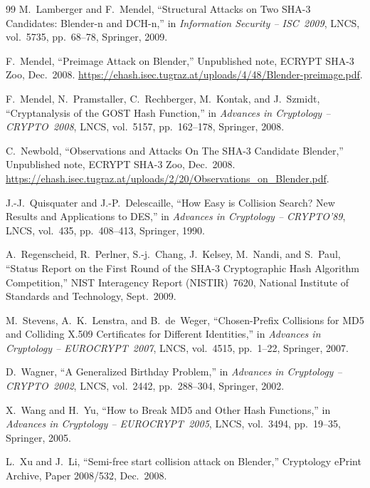 \documentclass[11pt,a4paper]{article}
\theoremstyle{definition}
\theoremstyle{remark}
\begin{document}
{\begin{thebibliography}{99}
M.~Lamberger and F.~Mendel,
``Structural Attacks on Two SHA-3 Candidates: Blender-n and DCH-n,'' in \emph{Information Security -- ISC~2009}, LNCS, vol.~5735, pp.~68--78, Springer, 2009.

F.~Mendel,
``Preimage Attack on Blender,'' Unpublished note, ECRYPT SHA-3 Zoo, Dec.~2008. \url{https://ehash.isec.tugraz.at/uploads/4/48/Blender-preimage.pdf}.

F.~Mendel, N.~Pramstaller, C.~Rechberger, M.~Kontak, and J.~Szmidt,
``Cryptanalysis of the GOST Hash Function,'' in \emph{Advances in Cryptology -- CRYPTO~2008}, LNCS, vol.~5157, pp.~162--178, Springer, 2008.

C.~Newbold,
``Observations and Attacks On The SHA-3 Candidate Blender,'' Unpublished note, ECRYPT SHA-3 Zoo, Dec.~2008. \url{https://ehash.isec.tugraz.at/uploads/2/20/Observations_on_Blender.pdf}.

J.-J.~Quisquater and J.-P.~Delescaille,
``How Easy is Collision Search? New Results and Applications to DES,'' in \emph{Advances in Cryptology -- CRYPTO'89}, LNCS, vol.~435, pp.~408--413, Springer, 1990.

A.~Regenscheid, R.~Perlner, S.-j.~Chang, J.~Kelsey, M.~Nandi, and S.~Paul,
``Status Report on the First Round of the SHA-3 Cryptographic Hash Algorithm Competition,'' NIST Interagency Report (NISTIR)~7620, National Institute of Standards and Technology, Sept.~2009.

M.~Stevens, A.~K.~Lenstra, and B.~de~Weger,
``Chosen-Prefix Collisions for MD5 and Colliding X.509 Certificates for Different Identities,'' in \emph{Advances in Cryptology -- EUROCRYPT~2007}, LNCS, vol.~4515, pp.~1--22, Springer, 2007.

D.~Wagner,
``A Generalized Birthday Problem,'' in \emph{Advances in Cryptology -- CRYPTO~2002}, LNCS, vol.~2442, pp.~288--304, Springer, 2002.

X.~Wang and H.~Yu,
``How to Break MD5 and Other Hash Functions,'' in \emph{Advances in Cryptology -- EUROCRYPT~2005}, LNCS, vol.~3494, pp.~19--35, Springer, 2005.

L.~Xu and J.~Li,
``Semi-free start collision attack on Blender,'' Cryptology ePrint Archive, Paper 2008/532, Dec.~2008.

\end{thebibliography}
}
\end{document}
